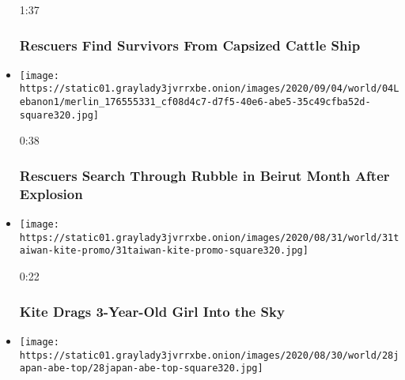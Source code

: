 \begin{itemize}
  1:37

  \hypertarget{rescuers-find-survivors-from-capsized-cattle-ship}{%
  \subsubsection{Rescuers Find Survivors From Capsized Cattle
  Ship}\label{rescuers-find-survivors-from-capsized-cattle-ship}}
\item
  \href{https://www.nytimes3xbfgragh.onion/video/world/middleeast/100000007325054/beirut-rescue-team-survivor.html?action=click\&module=video-series-bar\&region=header\&pgtype=Article\&playlistId=video/world}{}

  \texttt{[image: https://static01.graylady3jvrrxbe.onion/images/2020/09/04/world/04Lebanon1/merlin\_176555331\_cf08d4c7-d7f5-40e6-abe5-35c49cfba52d-square320.jpg]}

  0:38

  \hypertarget{rescuers-search-through-rubble-in-beirut-month-after-explosion}{%
  \subsubsection{Rescuers Search Through Rubble in Beirut Month After
  Explosion}\label{rescuers-search-through-rubble-in-beirut-month-after-explosion}}
\item
  \href{https://www.nytimes3xbfgragh.onion/video/world/asia/100000007316365/taiwan-kite-video.html?action=click\&module=video-series-bar\&region=header\&pgtype=Article\&playlistId=video/world}{}

  \texttt{[image: https://static01.graylady3jvrrxbe.onion/images/2020/08/31/world/31taiwan-kite-promo/31taiwan-kite-promo-square320.jpg]}

  0:22

  \hypertarget{kite-drags-3-year-old-girl-into-the-sky}{%
  \subsubsection{Kite Drags 3-Year-Old Girl Into the
  Sky}\label{kite-drags-3-year-old-girl-into-the-sky}}
\item
  \href{https://www.nytimes3xbfgragh.onion/video/us/100000007313110/japan-prime-minister-shinzo-abe-resigns-video.html?action=click\&module=video-series-bar\&region=header\&pgtype=Article\&playlistId=video/world}{}

  \texttt{[image: https://static01.graylady3jvrrxbe.onion/images/2020/08/30/world/28japan-abe-top/28japan-abe-top-square320.jpg]}


\end{itemize}
